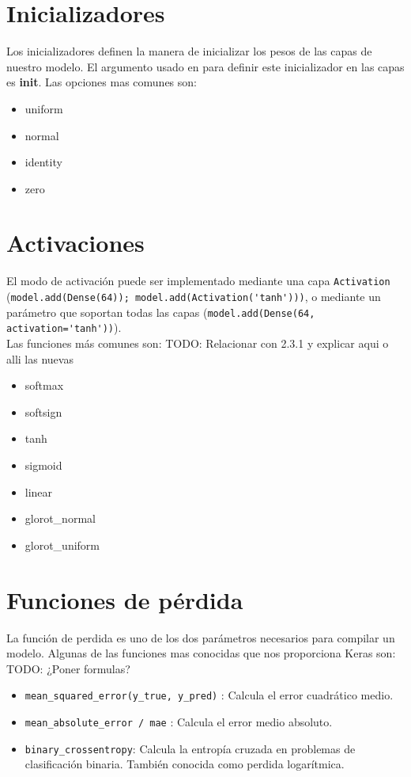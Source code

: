 \section{Inicializadores}
Los inicializadores definen la manera de inicializar los pesos de las capas de nuestro modelo. El argumento usado en para definir este inicializador en las capas es \textbf{init}. Las opciones mas comunes son:
\begin{itemize}[noitemsep]
\item uniform
\item normal
\item identity
\item zero
\end{itemize}

\section{Activaciones}
El modo de activación puede ser implementado mediante una capa \lstinline{Activation} (\lstinline{model.add(Dense(64)); model.add(Activation('tanh')))}, o mediante un parámetro que soportan todas las capas (\lstinline{model.add(Dense(64, activation='tanh'))}).\\
Las funciones más comunes son:
TODO: Relacionar con 2.3.1 y explicar aqui o alli las nuevas
\begin{itemize}[noitemsep]
\item softmax
\item softsign
\item tanh
\item sigmoid
\item linear
\item glorot_normal
\item glorot_uniform
\end{itemize}
\section{Funciones de pérdida}
La función de perdida es uno de los dos parámetros necesarios para compilar un modelo. Algunas de las funciones mas conocidas que nos proporciona Keras son:
TODO: ¿Poner formulas?
\begin{itemize}[noitemsep]
\item \lstinline{mean_squared_error(y_true, y_pred)} : Calcula el error cuadrático medio.
\item \lstinline{mean_absolute_error / mae} : Calcula el error medio absoluto.
\item \lstinline{binary_crossentropy}: Calcula la entropía cruzada en problemas de clasificación binaria. También conocida como perdida logarítmica.
\end{itemize}
